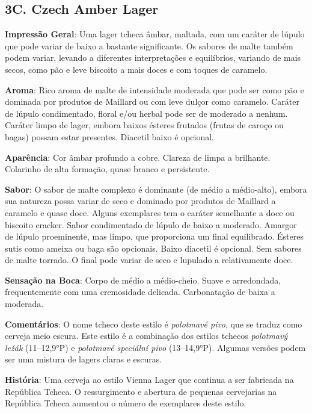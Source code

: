 \subsection*{3C. Czech Amber Lager}
\textbf{Impressão Geral}: Uma lager tcheca âmbar, maltada, com um caráter de lúpulo que pode variar de baixo a bastante significante. Os sabores de malte também podem variar, levando a diferentes interpretações e equilíbrios, variando de mais secos, como pão e leve biscoito a mais doces e com toques de caramelo.

\textbf{Aroma}: Rico aroma de malte de intensidade moderada que pode ser como pão e dominada por produtos de Maillard ou com leve dulçor como caramelo. Caráter de lúpulo condimentado, floral e/ou herbal pode ser de moderado a nenhum. Caráter limpo de lager, embora baixos ésteres frutados (frutas de caroço ou bagas) possam estar presentes. Diacetil baixo é opcional.

\textbf{Aparência}: Cor âmbar profundo a cobre. Clareza de limpa a brilhante. Colarinho de alta formação, quase branco e persistente.

\textbf{Sabor}: O sabor de malte complexo é dominante (de médio a médio-alto), embora sua natureza possa variar de seco e dominado por produtos de Maillard a caramelo e quase doce. Alguns exemplares tem o caráter semelhante a doce ou biscoito cracker. Sabor condimentado de lúpulo de baixo a moderado. Amargor de lúpulo proeminente, mas limpo, que proporciona um final equilibrado. Ésteres sutis como ameixa ou baga são opcionais. Baixo diacetil é opcional. Sem sabores de malte torrado. O final pode variar de seco e lupulado a relativamente doce.

\textbf{Sensação na Boca}: Corpo de médio a médio-cheio. Suave e arredondada, frequentemente com uma cremosidade delicada. Carbonatação de baixa a moderada.

\textbf{Comentários}: O nome tcheco deste estilo é \textit{polotmavé pivo}, que se traduz como cerveja meio escura. Este estilo é a combinação dos estilos tchecos \textit{polotmavý ležák} (11–12,9°P) e \textit{polotmavé speciální pivo} (13–14,9°P). Algumas versões podem ser uma mistura de lagers claras e escuras.

\textbf{História}: Uma cerveja ao estilo Vienna Lager que continua a ser fabricada na República Tcheca. O ressurgimento e abertura de pequenas cervejarias na República Tcheca aumentou o número de exemplares deste estilo.

